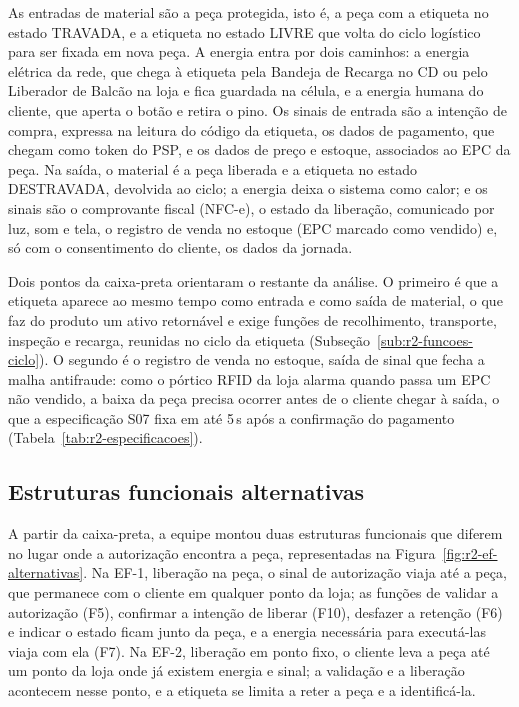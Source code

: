 As entradas de material são a peça protegida, isto é, a peça com a etiqueta no estado TRAVADA, e a etiqueta no estado LIVRE que volta do ciclo logístico para ser fixada em nova peça. A energia entra por dois caminhos: a energia elétrica da rede, que chega à etiqueta pela Bandeja de Recarga no CD ou pelo Liberador de Balcão na loja e fica guardada na célula, e a energia humana do cliente, que aperta o botão e retira o pino. Os sinais de entrada são a intenção de compra, expressa na leitura do código da etiqueta, os dados de pagamento, que chegam como token do PSP, e os dados de preço e estoque, associados ao EPC da peça. Na saída, o material é a peça liberada e a etiqueta no estado DESTRAVADA, devolvida ao ciclo; a energia deixa o sistema como calor; e os sinais são o comprovante fiscal (NFC-e), o estado da liberação, comunicado por luz, som e tela, o registro de venda no estoque (EPC marcado como vendido) e, só com o consentimento do cliente, os dados da jornada.

Dois pontos da caixa-preta orientaram o restante da análise. O primeiro é que a etiqueta aparece ao mesmo tempo como entrada e como saída de material, o que faz do produto um ativo retornável e exige funções de recolhimento, transporte, inspeção e recarga, reunidas no ciclo da etiqueta (Subseção~\ref{sub:r2-funcoes-ciclo}). O segundo é o registro de venda no estoque, saída de sinal que fecha a malha antifraude: como o pórtico RFID da loja alarma quando passa um EPC não vendido, a baixa da peça precisa ocorrer antes de o cliente chegar à saída, o que a especificação S07 fixa em até 5\,s após a confirmação do pagamento (Tabela~\ref{tab:r2-especificacoes}).

\subsection{Estruturas funcionais alternativas}
\label{sub:r2-ef-alternativas}

A partir da caixa-preta, a equipe montou duas estruturas funcionais que diferem no lugar onde a autorização encontra a peça, representadas na Figura~\ref{fig:r2-ef-alternativas}. Na EF-1, liberação na peça, o sinal de autorização viaja até a peça, que permanece com o cliente em qualquer ponto da loja; as funções de validar a autorização (F5), confirmar a intenção de liberar (F10), desfazer a retenção (F6) e indicar o estado ficam junto da peça, e a energia necessária para executá-las viaja com ela (F7). Na EF-2, liberação em ponto fixo, o cliente leva a peça até um ponto da loja onde já existem energia e sinal; a validação e a liberação acontecem nesse ponto, e a etiqueta se limita a reter a peça e a identificá-la.

